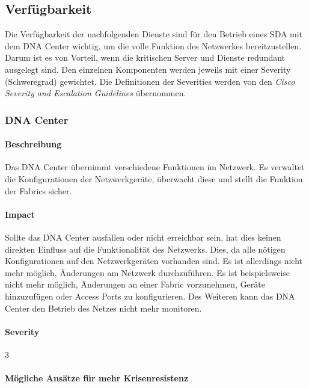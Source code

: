 \subsection{Verfügbarkeit}
Die Verfügbarkeit der nachfolgenden Dienste sind für den Betrieb eines SDA mit dem DNA Center wichtig, um die volle Funktion des Netzwerkes bereitzustellen. Darum ist es von Vorteil, wenn die kritischen Server und Dienste redundant ausgelegt sind. Den einzelnen Komponenten werden jeweils mit einer Severity (Schweregrad) gewichtet. Die Definitionen der Severities werden von den \textit{Cisco Severity and Escalation Guidelines} übernommen. \cite{cisco-severity-guidelines}

\subsubsection{DNA Center}

\paragraph{Beschreibung}

Das DNA Center übernimmt verschiedene Funktionen im Netzwerk. Es verwaltet die Konfigurationen der Netzwerkgeräte, überwacht diese und stellt die Funktion der Fabrics sicher. 

\paragraph{Impact}

Sollte das DNA Center ausfallen oder nicht erreichbar sein, hat dies keinen direkten Einfluss auf die Funktionalität des Netzwerks. Dies, da alle nötigen Konfigurationen auf den Netzwerkgeräten vorhanden sind. Es ist allerdings nicht mehr möglich, Änderungen am Netzwerk durchzuführen. Es ist beispielsweise nicht mehr möglich, Änderungen an einer Fabric vorzunehmen, Geräte hinzuzufügen oder Access Ports zu konfigurieren. Des Weiteren kann das DNA Center den Betrieb des Netzes nicht mehr monitoren.

\paragraph{Severity} 3

\paragraph{Mögliche Ansätze für mehr Krisenresistenz}

